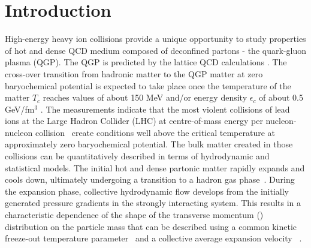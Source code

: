 
\section{Introduction}

High-energy heavy ion collisions provide a unique opportunity to study properties of hot and dense QCD medium composed of deconfined partons - the quark-gluon plasma (QGP). 
The QGP is predicted by the lattice QCD calculations \cite{Satz:2000bn,Bass:1998vz,Shuryak:1984nq,Cleymans:1985wb}. 
The cross-over transition from hadronic matter to the QGP matter at zero baryochemical potential is expected to take place once the temperature of the matter $T_{c}$ reaches values of about 150 MeV and/or energy density $\epsilon_{c}$ of about 0.5 GeV/fm$^3$ \cite{Borsanyi:2010cj,Bhattacharya:2014ara}. 
The measurements indicate that the most violent collisions of lead ions at the Large Hadron Collider (LHC) at
centre-of-mass energy per nucleon-nucleon collision \ create conditions well above the critical temperature at approximately zero baryochemical potential.
The bulk matter created in those collisions can be quantitatively described in terms of hydrodynamic and statistical
models. 
The initial hot and dense partonic matter rapidly expands and cools down, ultimately undergoing a transition to a hadron gas phase~\cite{Muller:2006ee}. 
During the expansion phase, collective hydrodynamic flow develops from the initially generated pressure gradients in the strongly interacting system. 
This results in a characteristic dependence of the shape of the transverse momentum (\pt) distribution on the particle mass that can be described using a common kinetic freeze-out temperature parameter \Tfo\ and a collective average expansion velocity \avbT~\cite{Schnedermann:1993ws}.

